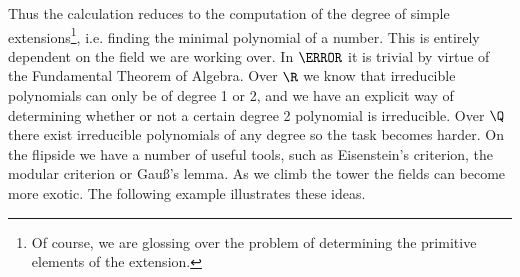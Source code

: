 \documentclass[12pt,oneside]{book}
\begin{document}
Thus the calculation reduces to the computation of the degree of simple
extensions\footnote{Of course, we are glossing over the problem of determining the
primitive elements of the extension.}, i.e. finding the minimal polynomial of a number.
This is entirely dependent on the field we are working over. In \( \C \) it is trivial by
virtue of the Fundamental Theorem of Algebra. Over \( \R \) we know that irreducible
polynomials can only be of degree 1 or 2, and we have an explicit way of determining
whether or not a certain degree 2 polynomial is irreducible. Over \( \Q \) there exist
irreducible polynomials of any degree so the task becomes harder. On the flipside we have
a number of useful tools, such as Eisenstein's criterion, the modular criterion or
Gau\ss's lemma. As we climb the tower the fields can become more exotic. The following example illustrates these ideas.
\end{document}
